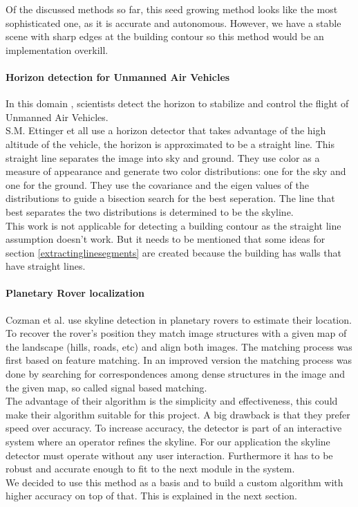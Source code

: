 Of the discussed methods so far, this seed growing method looks like the most sophisticated one, as
it is accurate and autonomous. However, we have a stable scene with sharp edges
at the building contour so this method would be an implementation overkill.  


\paragraph{Horizon detection for Unmanned Air Vehicles}
In this domain \cite{Guidedflight}, scientists detect the horizon to stabilize and control the
flight of Unmanned Air Vehicles.\\  
S.M. Ettinger et all \cite{Guidedflight} use a horizon detector that takes
advantage of the high altitude of the vehicle, the horizon is approximated to be
a straight line.  
This straight line separates the image into sky and ground. They use color as
a measure of appearance and generate two color distributions: one for the sky
and one for the ground. They use the covariance and the eigen values of the
distributions to guide a bisection search for the best seperation. The line that
best separates the two distributions is determined to be the skyline.\\

This work is not applicable for detecting a building contour as the straight
line assumption doesn't work.  But it needs to be mentioned that some ideas
for section \ref{extractinglinesegments} are created because the building has
	walls that have straight lines.

\paragraph{Planetary Rover localization}
Cozman et al. \cite{Rover} use skyline detection in planetary rovers to estimate 
their location.  
To recover the rover's position they match image structures with a given map
of the landscape (hills, roads, etc) and align both images.
The matching process was first based on feature matching. In an improved version the matching process was done by searching for correspondences among dense structures in the image and the given map, so called signal based matching.\\
The advantage of their algorithm is the simplicity and effectiveness, this
could make their algorithm suitable for this project.  A big drawback is that
they prefer speed over accuracy.  To increase accuracy, the detector is part
of an interactive system where an operator refines the skyline.  For our
application the skyline detector must operate without any user interaction.
Furthermore it has to be robust and accurate enough to fit to the next module
in the system.\\
We decided to use this method as a basis and to
build a custom algorithm with higher accuracy on top of that. This is explained
in the next section.


